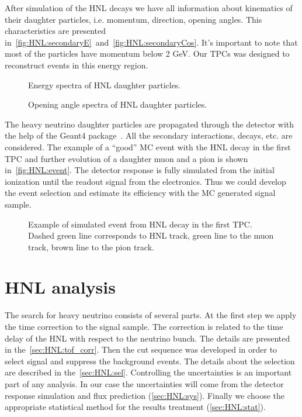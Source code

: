 \documentclass[../main.tex]{subfiles}
\begin{document}
After simulation of the HNL decays we have all information about kinematics of their daughter particles, i.e. momentum, direction, opening angles. This characteristics are presented in~\autoref{fig:HNL:secondaryE}~and~\autoref{fig:HNL:secondaryCos}. It's important to note that most of the particles have momentum below 2 GeV. Our TPCs was designed to reconstruct events in this energy region.
\begin{figure}[!ht]
\begin{center}
    \caption{Energy spectra of HNL daughter particles.}
    \label{fig:HNL:secondaryE}
\end{center}
\end{figure}
\begin{figure}[!ht]
\begin{center}
    \caption{Opening angle spectra of HNL daughter particles.}
    \label{fig:HNL:secondaryCos}
\end{center}
\end{figure}
The heavy neutrino daughter particles are propagated through the detector with the help of the Geant4 package~\cite{Agostinelli2003}. All the secondary interactions, decays, etc. are considered.
The example of a ``good'' MC event with the HNL decay in the first TPC and further evolution of a daughter muon and a pion is shown in~\autoref{fig:HNL:event}. The detector response is fully simulated from the initial ionization until the readout signal from the electronics. Thus we could develop the event selection and estimate its efficiency with the MC generated signal sample.
\begin{figure}[!ht]
    \caption{Example of simulated event from HNL decay in the first TPC. Dashed green line corresponds to HNL track, green line to the muon track, brown line to the pion track.}
    \label{fig:HNL:event}
\end{figure}

\chapter{HNL analysis}
\label{ch:HNL:ana}
The search for heavy neutrino consists of several parts. At the first step we apply the time correction to the signal sample. The correction is related to the time delay of the HNL with respect to the neutrino bunch. The details are presented in the~\autoref{sec:HNL:tof_corr}. Then the cut sequence was developed in order to select signal and suppress the background events. The details about the selection are described in the~\autoref{sec:HNL:sel}. Controlling the uncertainties is an important part of any analysis. In our case the uncertainties will come from the detector response simulation and flux prediction (\autoref{sec:HNL:sys}). Finally we choose the appropriate statistical method for the results treatment (\autoref{sec:HNL:stat}).
\end{document}
